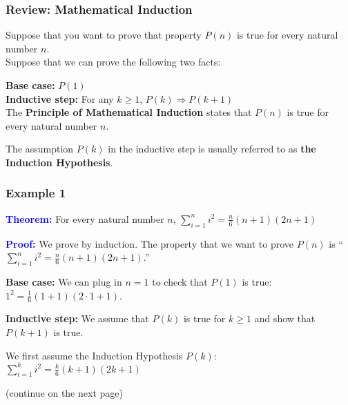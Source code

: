 

\begin{frame}\frametitle{Review: Mathematical Induction}
  \begin{tcolorbox}
    Suppose that you want to prove that property $P(n)$ is true for
    every natural number $n$.\\
    
    Suppose that we can prove the following two facts:
    
    {\bf Base case:} $P(1)$ \\
    {\bf Inductive step:} For any $k\geq 1$, $P(k)\Rightarrow P(k+1)$ \\
    
    The {\bf Principle of Mathematical Induction} states that $P(n)$
    is true for every natural number $n$.
  \end{tcolorbox}

  The assumption $P(k)$ in the inductive step is usually referred to
  as {\bf the Induction Hypothesis}.
\end{frame}

\begin{frame}\frametitle{Example 1}
  {\bf \textcolor{blue}{Theorem:}}
  For every natural number $n$, $\sum_{i=1}^n i^2 = \frac{n}{6}(n+1)(2n+1)$
  \vspace{0.15in}
  
  {\bf \textcolor{blue}{Proof:}}
  We prove by induction.  The property that we want to prove $P(n)$
  is ``$\sum_{i=1}^n i^2 = \frac{n}{6}(n+1)(2n+1)$.''
  \vspace{0.15in}

  \pause

  {\bf Base case:} We can plug in $n=1$ to check that $P(1)$ is
  true: $1^2 = \frac{1}{6}(1+1)(2\cdot 1+1)$.
  \vspace{0.15in}

  {\bf Inductive step:} We assume that $P(k)$ is true for $k\geq 1$
  and show that $P(k+1)$ is true.
  \vspace{0.15in}

  We first assume the Induction Hypothesis $P(k)$: $ \sum_{i=1}^k
  i^2 = \frac{k}{6}(k+1)(2k+1)$
  \vspace{0.15in}

  (continue on the next page)
\end{frame}

